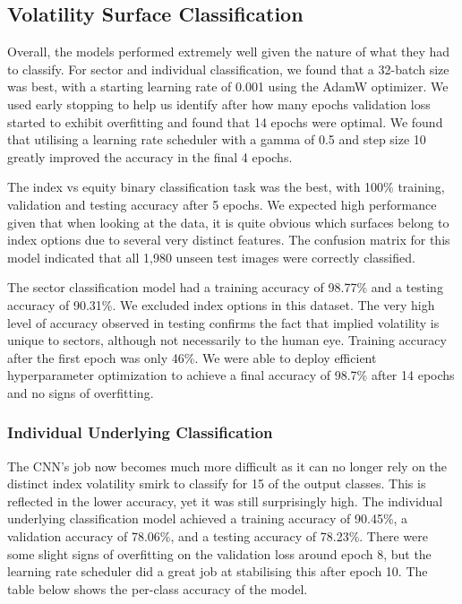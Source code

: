 \documentclass[10pt]{article}
\begin{document}
\subsection{Volatility Surface Classification}
Overall, the models performed extremely well given the nature of what they had to classify. For sector and individual classification, we found that a 32-batch size was best, with a starting learning rate of 0.001 using the AdamW optimizer. We used early stopping to help us identify after how many epochs validation loss started to exhibit overfitting and found that 14 epochs were optimal. We found that utilising a learning rate scheduler with a gamma of 0.5 and step size 10 greatly improved the accuracy in the final 4 epochs.

The index vs equity binary classification task was the best, with 100\% training, validation and testing accuracy after 5 epochs. We expected high performance given that when looking at the data, it is quite obvious which surfaces belong to index options due to several very distinct features. The confusion matrix for this model indicated that all 1,980 unseen test images were correctly classified. 

The sector classification model had a training accuracy of 98.77\% and a testing accuracy of 90.31\%. We excluded index options in this dataset. The very high level of accuracy observed in testing confirms the fact that implied volatility is unique to sectors, although not necessarily to the human eye. Training accuracy after the first epoch was only 46\%. We were able to deploy efficient hyperparameter optimization to achieve a final accuracy of 98.7\% after 14 epochs and no signs of overfitting.


\subsubsection{Individual Underlying Classification}

The CNN's job now becomes much more difficult as it can no longer rely on the distinct index volatility smirk to classify for 15 of the output classes. This is reflected in the lower accuracy, yet it was still surprisingly high. The individual underlying classification model achieved a training accuracy of 90.45\%, a validation accuracy of 78.06\%, and a testing accuracy of 78.23\%. There were some slight signs of overfitting on the validation loss around epoch 8, but the learning rate scheduler did a great job at stabilising this after epoch 10. The table below shows the per-class accuracy of the model.
\end{document}

